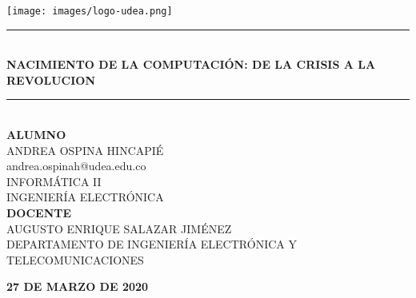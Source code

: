 \documentclass[a4paper,11pt]{article}
\newcommand{\HRule}{\rule{\linewidth}{0.5mm}}
\begin{document}
\begin{titlepage}
\begin{center}

\texttt{[image: images/logo-udea.png]}~
\\[2cm]



\HRule \\[0.4cm]
{\large \bfseries NACIMIENTO DE LA COMPUTACIÓN: DE LA CRISIS A LA REVOLUCION \\
[0.4cm]}
\HRule 
\\[2cm]

\large\textbf{ALUMNO}\\[1cm]
ANDREA OSPINA HINCAPIÉ\\
andrea.ospinah@udea.edu.co\\
INFORMÁTICA II \\
 INGENIERÍA ELECTRÓNICA
\\[1.5cm]

\large\textbf{DOCENTE}\\[1cm]
AUGUSTO ENRIQUE SALAZAR JIMÉNEZ\\
DEPARTAMENTO DE INGENIERÍA ELECTRÓNICA Y TELECOMUNICACIONES
\\[1cm]



\vfill

{\large \textbf{27 DE MARZO DE 2020}}

\end{center}
\end{titlepage}
\end{document}
